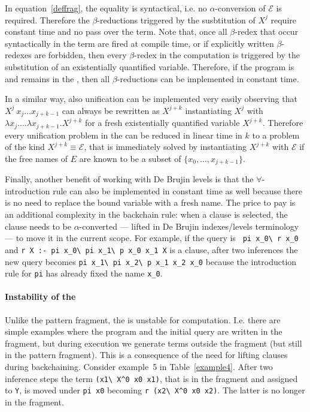 \documentclass{llncs}
\begin{document}
In equation~\ref{deffrag}, the equality is syntactical, i.e. no $\alpha$-conversion of $\mathcal{E}$ is required. Therefore the $\beta$-reductions triggered
by the susbtitution of $X^j$ require constant time and no pass over the term.
Note that, once all $\beta$-redex that occur syntactically in the term are
fired at compile time, or if explicitly written $\beta$-redexes are forbidden,
then every $\beta$-redex in the computation is triggered by the substitution
of an existentially quantified variable. Therefore, if the program is and
remains in the \frag, then all $\beta$-reductions can be implemented in
constant time.

In a similar way, also unification can be implemented very easily observing
that $X^j~x_j\ldots x_{j+k-1}$ can always be rewritten as
$X^{j+k}$ instantiating $X^j$ with $\lambda x_j. \ldots \lambda x_{j+k-1}. X^{j+k}$ for a fresh existentially quantified variable $X^{j+k}$. Therefore every
unification problem in the \frag{} can be reduced in linear time in $k$ to a
problem of the kind $X^{j+k} \equiv \mathcal{E}$, that is immediately solved
by instantiating $X^{j+k}$ with $\mathcal{E}$ if the free names of $E$ are
known to be a subset of $\{x_0,\ldots,x_{j+k-1}\}$.

Finally, another benefit of working with De Brujin levels is that the
$\forall$-introduction rule can also be implemented in constant time as well
because there is no need to replace the bound variable with a fresh name.
The price to pay is an additional complexity in the backchain rule: when
a clause is selected, the clause needs to be $\alpha$-converted --- lifted
in De Brujin indexes/levels terminology --- to move it in the current scope.
For example, if the query is \verb+ pi x_0\ r x_0+ and \verb+r X :- pi x_0\ pi x_1\ p x_0 x_1 X+ is a clause, after two inferences the new query becomes
\verb+pi x_1\ pi x_2\ p x_1 x_2 x_0+ because the introduction rule for
\verb+pi+ has already fixed the name \verb+x_0+.

\paragraph{Instability of the \frag}
Unlike the pattern fragment, the \frag{} is unstable for computation.
I.e. there are simple examples where the program and the initial query are
written in the fragment, but during execution we generate terms outside the
fragment (but still in the pattern fragment). This is a consequence of the
need for lifting clauses during backchaining.
Consider example~5 in Table~\ref{example4}.
After two inference steps the term \verb+(x1\ X^0 x0 x1)+, that is in
the fragment and assigned to \verb+Y+, is moved under \verb+pi x0+ becoming
\verb+r (x2\ X^0 x0 x2)+. The latter is no longer in the fragment.
\end{document}
